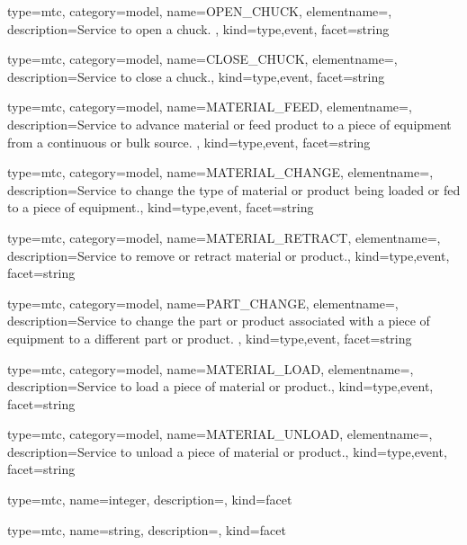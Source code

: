 {
  type=mtc,
  category=model,
  name={OPEN\_CHUCK},
  elementname=,
  description={Service to open a chuck. },
  kind={type,event},
  facet={\gls{string}}
}


{
  type=mtc,
  category=model,
  name={CLOSE\_CHUCK},
  elementname=,
  description={Service to close a chuck.},
  kind={type,event},
  facet={\gls{string}}
}


{
  type=mtc,
  category=model,
  name={MATERIAL\_FEED},
  elementname=,
  description={Service to advance material or feed product to a piece of equipment from a continuous or bulk source. },
  kind={type,event},
  facet={\gls{string}}
}


{
  type=mtc,
  category=model,
  name={MATERIAL\_CHANGE},
  elementname=,
  description={Service to change the type of material or product being loaded or fed to a piece of equipment.},
  kind={type,event},
  facet={\gls{string}}
}


{
  type=mtc,
  category=model,
  name={MATERIAL\_RETRACT},
  elementname=,
  description={Service to remove or retract material or product.},
  kind={type,event},
  facet={\gls{string}}
}


{
  type=mtc,
  category=model,
  name={PART\_CHANGE},
  elementname=,
  description={Service to change the part or product associated with a piece of equipment to a different part or product.  },
  kind={type,event},
  facet={\gls{string}}
}


{
  type=mtc,
  category=model,
  name={MATERIAL\_LOAD},
  elementname=,
  description={Service to load a piece of material or product.},
  kind={type,event},
  facet={\gls{string}}
}


{
  type=mtc,
  category=model,
  name={MATERIAL\_UNLOAD},
  elementname=,
  description={Service to unload a piece of material or product.},
  kind={type,event},
  facet={\gls{string}}
}


{
  type=mtc,
  name={integer},
  description={},
  kind={facet}
}


{
  type=mtc,
  name={string},
  description={},
  kind={facet}
}


